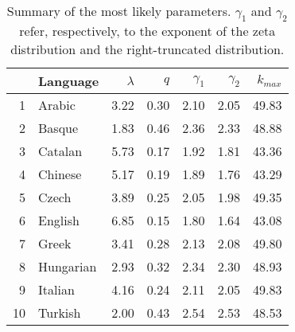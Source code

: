 \begin{table}[ht]
\centering
\begin{tabular}{rlrrrrr}
	\toprule
 & Language & $\lambda$ & $q$ & $\gamma_1$ & $\gamma_2$ & $k_{max}$ \\
	\midrule
1 & Arabic & 3.22 & 0.30 & 2.10 & 2.05 & 49.83 \\ 
  2 & Basque & 1.83 & 0.46 & 2.36 & 2.33 & 48.88 \\ 
  3 & Catalan & 5.73 & 0.17 & 1.92 & 1.81 & 43.36 \\ 
  4 & Chinese & 5.17 & 0.19 & 1.89 & 1.76 & 43.29 \\ 
  5 & Czech & 3.89 & 0.25 & 2.05 & 1.98 & 49.35 \\ 
  6 & English & 6.85 & 0.15 & 1.80 & 1.64 & 43.08 \\ 
  7 & Greek & 3.41 & 0.28 & 2.13 & 2.08 & 49.80 \\ 
  8 & Hungarian & 2.93 & 0.32 & 2.34 & 2.30 & 48.93 \\ 
	9 & Italian & 4.16 & 0.24 & 2.11 & 2.05 & 49.83 \\
 10 & Turkish & 2.00 & 0.43 & 2.54 & 2.53 & 48.53 \\
	\bottomrule
\end{tabular}
\caption{Summary of the most likely parameters. $\gamma_1$ and $\gamma_2$ refer, 
respectively, to the exponent of the zeta distribution and the right-truncated 
distribution.}
\label{table3}
\end{table}

